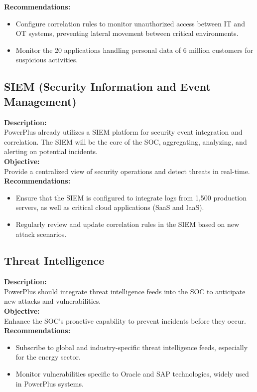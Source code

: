 \textbf{Recommendations:}
\begin{itemize}
    \item Configure correlation rules to monitor unauthorized access between IT and OT systems, preventing lateral movement between critical environments.
    \item Monitor the 20 applications handling personal data of 6 million customers for suspicious activities.
\end{itemize}

\subsection*{ SIEM (Security Information and Event Management)}
\textbf{Description:} \\
PowerPlus already utilizes a SIEM platform for security event integration and correlation. The SIEM will be the core of the SOC, aggregating, analyzing, and alerting on potential incidents. \\

\textbf{Objective:} \\
Provide a centralized view of security operations and detect threats in real-time. \\

\textbf{Recommendations:}
\begin{itemize}
    \item Ensure that the SIEM is configured to integrate logs from 1,500 production servers, as well as critical cloud applications (SaaS and IaaS).
    \item Regularly review and update correlation rules in the SIEM based on new attack scenarios.
\end{itemize}

\subsection*{ Threat Intelligence}
\textbf{Description:} \\
PowerPlus should integrate threat intelligence feeds into the SOC to anticipate new attacks and vulnerabilities. \\

\textbf{Objective:} \\
Enhance the SOC's proactive capability to prevent incidents before they occur. \\

\textbf{Recommendations:}
\begin{itemize}
    \item Subscribe to global and industry-specific threat intelligence feeds, especially for the energy sector.
    \item Monitor vulnerabilities specific to Oracle and SAP technologies, widely used in PowerPlus systems.
\end{itemize}

